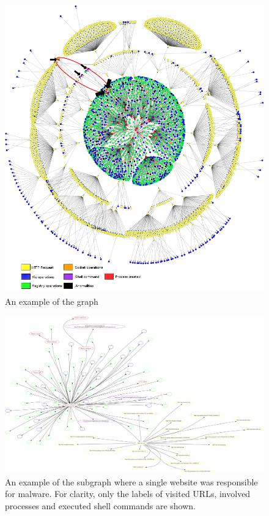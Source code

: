 \begin{figure}[h]
    \centering
    \centerline{\includegraphics[width=20cm]{Images/graph4.jpg}}
    \caption{An example of the graph}
    \label{fig:graph}
\end{figure}

\begin{figure}[h]
    \centering
    \includegraphics[width=25cm, angle=90]{Images/report_Subprocess_from_tab}
    \caption{An example of the subgraph where a single website was responsible for malware. For clarity, only the labels of visited URLs, involved processes and executed shell commands are shown.}
    \label{fig:subgraph}
\end{figure}

